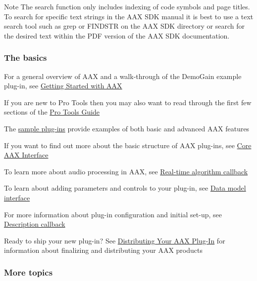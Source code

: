 \begin{DoxyNote}{Note}
The search function only includes indexing of code symbols and page titles. To search for specific text strings in the A\+A\+X S\+D\+K manual it is best to use a text search tool such as grep or F\+I\+N\+D\+S\+T\+R on the A\+A\+X S\+D\+K directory or search for the desired text within the P\+D\+F version of the A\+A\+X S\+D\+K documentation.
\end{DoxyNote}
\hypertarget{a00323_welcome_basics}{}\subsubsection{The basics}\label{a00323_welcome_basics}
\begin{DoxyItemize}
\item For a general overview of A\+A\+X and a walk-\/through of the Demo\+Gain example plug-\/in, see \hyperlink{a00324}{Getting Started with A\+A\+X} \item If you are new to Pro Tools then you may also want to read through the first few sections of the \hyperlink{a00360}{Pro Tools Guide} \item The \hyperlink{a00376}{sample plug-\/ins} provide examples of both basic and advanced A\+A\+X features \item If you want to find out more about the basic structure of A\+A\+X plug-\/ins, see \hyperlink{a00325}{Core A\+A\+X Interface} \item To learn more about audio processing in A\+A\+X, see \hyperlink{a00327}{Real-\/time algorithm callback} \item To learn about adding parameters and controls to your plug-\/in, see \hyperlink{a00328}{Data model interface} \item For more information about plug-\/in configuration and initial set-\/up, see \hyperlink{a00326}{Description callback} \item Ready to ship your new plug-\/in? See \hyperlink{a00372}{Distributing Your A\+A\+X Plug-\/\+In} for information about finalizing and distributing your A\+A\+X products\end{DoxyItemize}
\hypertarget{a00323_welcome_more}{}\subsubsection{More topics}\label{a00323_welcome_more}
